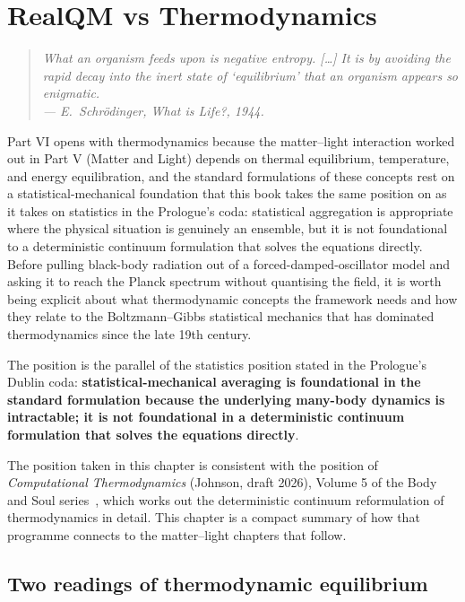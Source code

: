 \chapter{RealQM vs Thermodynamics}\label{ch:thermodynamics}

\begin{quote}
\itshape What an organism feeds upon is negative entropy. [\ldots] It is by avoiding the rapid decay into the inert state of `equilibrium' that an organism appears so enigmatic.\\
\normalfont\hfill --- E.~Schr\"odinger, \emph{What is Life?}, 1944.
\end{quote}
\bigskip

Part VI opens with thermodynamics because the matter--light interaction worked out in Part V (Matter and Light) depends on thermal equilibrium, temperature, and energy equilibration, and the standard formulations of these concepts rest on a statistical-mechanical foundation that this book takes the same position on as it takes on statistics in the Prologue's coda: statistical aggregation is appropriate where the physical situation is genuinely an ensemble, but it is not foundational to a deterministic continuum formulation that solves the equations directly. Before pulling black-body radiation out of a forced-damped-oscillator model and asking it to reach the Planck spectrum without quantising the field, it is worth being explicit about what thermodynamic concepts the framework needs and how they relate to the Boltzmann--Gibbs statistical mechanics that has dominated thermodynamics since the late 19th century.

The position is the parallel of the statistics position stated in the Prologue's Dublin coda: \textbf{statistical-mechanical averaging is foundational in the standard formulation because the underlying many-body dynamics is intractable; it is not foundational in a deterministic continuum formulation that solves the equations directly}.

The position taken in this chapter is consistent with the position of \emph{Computational Thermodynamics} (Johnson, draft 2026), Volume 5 of the Body and Soul series~\cite{BodyAndSoulV}, which works out the deterministic continuum reformulation of thermodynamics in detail. This chapter is a compact summary of how that programme connects to the matter--light chapters that follow.

\section{Two readings of thermodynamic equilibrium}\label{sec:two-thermo}

